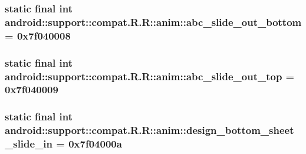 \hypertarget{classandroid_1_1support_1_1compat_1_1_r_1_1anim_d91de4ddeeec9de8043393ada41b52c5}{
\subsubsection[{abc\_\-slide\_\-out\_\-bottom}]{\setlength{\rightskip}{0pt plus 5cm}static final int android::support::compat.R.R::anim::abc\_\-slide\_\-out\_\-bottom = 0x7f040008}}
\label{classandroid_1_1support_1_1compat_1_1_r_1_1anim_d91de4ddeeec9de8043393ada41b52c5}


\hypertarget{classandroid_1_1support_1_1compat_1_1_r_1_1anim_155f712034d46db182c3b786d757cab7}{
\subsubsection[{abc\_\-slide\_\-out\_\-top}]{\setlength{\rightskip}{0pt plus 5cm}static final int android::support::compat.R.R::anim::abc\_\-slide\_\-out\_\-top = 0x7f040009}}
\label{classandroid_1_1support_1_1compat_1_1_r_1_1anim_155f712034d46db182c3b786d757cab7}


\hypertarget{classandroid_1_1support_1_1compat_1_1_r_1_1anim_6e1b9dc6623c187c4b8dde40f769b922}{
\subsubsection[{design\_\-bottom\_\-sheet\_\-slide\_\-in}]{\setlength{\rightskip}{0pt plus 5cm}static final int android::support::compat.R.R::anim::design\_\-bottom\_\-sheet\_\-slide\_\-in = 0x7f04000a}}
\label{classandroid_1_1support_1_1compat_1_1_r_1_1anim_6e1b9dc6623c187c4b8dde40f769b922}


